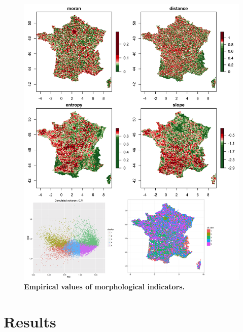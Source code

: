 \documentclass[10pt,letterpaper,draft]{article}
\begin{document}
\begin{figure}
\includegraphics[width=\textwidth]{figures/Fig1.png}
\caption{\textbf{Empirical values of morphological indicators.} }
\label{fig:empirical}
\end{figure}











\section*{Results}
\end{document}
